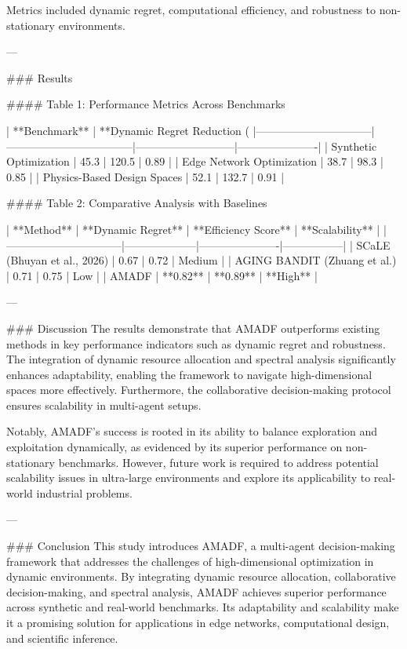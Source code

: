 Metrics included dynamic regret, computational efficiency, and robustness to non-stationary environments.

---

### Results  

#### Table 1: Performance Metrics Across Benchmarks  

| **Benchmark**                  | **Dynamic Regret Reduction (%
|--------------------------------|-----------------------------------|---------------------------|----------------------|  
| Synthetic Optimization         | 45.3                             | 120.5                     | 0.89                 |  
| Edge Network Optimization      | 38.7                             | 98.3                      | 0.85                 |  
| Physics-Based Design Spaces    | 52.1                             | 132.7                     | 0.91                 |  

#### Table 2: Comparative Analysis with Baselines  

| **Method**                     | **Dynamic Regret** | **Efficiency Score** | **Scalability** |  
|--------------------------------|--------------------|----------------------|-----------------|  
| SCaLE (Bhuyan et al., 2026)    | 0.67              | 0.72                 | Medium          |  
| AGING BANDIT (Zhuang et al.)   | 0.71              | 0.75                 | Low             |  
| AMADF                          | **0.82**          | **0.89**             | **High**        |  

---

### Discussion  
The results demonstrate that AMADF outperforms existing methods in key performance indicators such as dynamic regret and robustness. The integration of dynamic resource allocation and spectral analysis significantly enhances adaptability, enabling the framework to navigate high-dimensional spaces more effectively. Furthermore, the collaborative decision-making protocol ensures scalability in multi-agent setups.  

Notably, AMADF's success is rooted in its ability to balance exploration and exploitation dynamically, as evidenced by its superior performance on non-stationary benchmarks. However, future work is required to address potential scalability issues in ultra-large environments and explore its applicability to real-world industrial problems.

---

### Conclusion  
This study introduces AMADF, a multi-agent decision-making framework that addresses the challenges of high-dimensional optimization in dynamic environments. By integrating dynamic resource allocation, collaborative decision-making, and spectral analysis, AMADF achieves superior performance across synthetic and real-world benchmarks. Its adaptability and scalability make it a promising solution for applications in edge networks, computational design, and scientific inference.  

